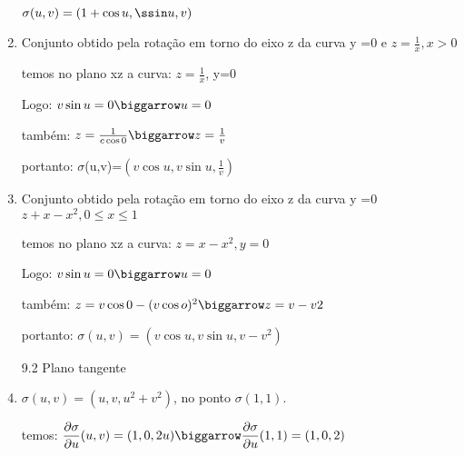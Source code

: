 \documentclass[11pt,a4paper]{article}
\begin{document}
\begin{enumerate}
	$\sigma (u,v)=(1+\cos u, \ssin u, v)$\newline
	
	\item Conjunto obtido pela rotação em torno do eixo z da curva y =0 e $z= \frac{1}{x}, x > 0$
	
	temos no plano xz a curva:\newline
	$z=\frac{1}{x}$, y=0\newline 
	
	Logo: \newline
	$v\sin u=0 \biggarrow u=0$ \newline
	
	também:\newline
	$z= \frac{1}{c\cos 0} \biggarrow z=\frac{1}{v}$\newline 
	
	portanto: \newline
	$\sigma$(u,v)=$(v\cos u, v\sin u, \frac{1}{v})$\newline
	
	\item Conjunto obtido pela rotação em torno do eixo z da curva y =0 $z+x-x^{2},0 \leq x \leq 1 $
	
	temos no plano xz a curva:\newline
    $z=x-x^{2}, y=0$\newline
	
	Logo: \newline
	$v\sin u=0 \biggarrow u=0$\newline 
	
	também:\newline
	$z= v\cos 0 -(v\cos o)^{2} \biggarrow z=v-v{2}$ \newline
	
	portanto: \newline
	$\sigma(u,v)=(v\cos u, v\sin u,v-v^{2})$\newline

	
	
	
	\begin{center}
	\large 9.2 Plano tangente 
	\end{center}
	
	
	
	
	\item $ \sigma(u, v)=(u, v, u^{2}+v^{2})$, no ponto $\sigma(1,1)$.
	
	temos: \newline
	$\dfrac {\partial \sigma} {\partial u}(u, v)=(1, 0, 2u) \biggarrow \dfrac{\partial \sigma}{\partial u}(1, 1) =(1, 0, 2)$ \newline
	

\end{enumerate}
\end{document}
